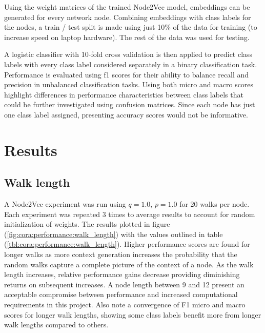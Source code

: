 \documentclass[a4paper,10pt]{article}
\begin{document}
Using the weight matrices of the trained Node2Vec model, embeddings can be generated for every network node. Combining embeddings with class labels for the nodes, a train / test split is made using just 10\% of the data for training (to increase speed on laptop hardware). The rest of the data was used for testing.

A logistic classifier with 10-fold cross validation is then applied to predict class labels with every class label considered separately in a binary classification task. Performance is evaluated using f1 scores for their ability to balance recall and precision in unbalanced classification tasks. Using both micro and macro scores highlight differences in performance characteristics between class labels that could be further investigated using confusion matrices. Since each node has just one class label assigned, presenting accuracy scores would not be informative.


\section{Results}

\subsection{Walk length}

A Node2Vec experiment was run using $q = 1.0$, $p = 1.0$ for $20$ walks per node. Each experiment was repeated $3$ times to average results to account for random initialization of weights. The results plotted in figure (\ref{fig:cora:performance:walk_length}) with the values outlined in table (\ref{tbl:cora:performance:walk_length}). Higher performance scores are found for longer walks as more context generation increases the probability that the random walks capture a complete picture of the context of a node. As the walk length increases, relative performance gains decrease providing diminishing returns on subsequent increases. A node length between 9 and 12 present an acceptable compromise between performance and increased computational requirements in this project. Also note a convergence of F1 micro and macro scores for longer walk lengths, showing some class labels benefit more from longer walk lengths compared to others.

\vspace{1em}


\end{document}
